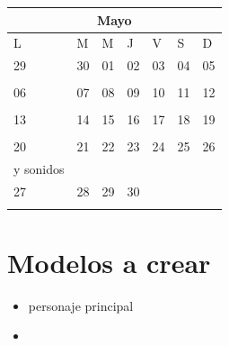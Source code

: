 \documentclass{article}
\begin{document}
\begin{center} 
\begin{tabular}{|m{2cm}|m{2cm}|m{2cm}|m{2cm}|m{2cm}|m{2cm}|m{2cm}|} 
\multicolumn{7}{c}{Mayo}\\
\hline
L&M&M&J&V&S&D\\
\hline
29&30&01&02&03&04&05\\
&&&&&&\\
\hline
06&07&08&09&10&11&12\\
&&&&&&\\
\hline
13&14&15&16&17&18&19\\
&&&&&&\\
\hline
20&21&22&23&24&25&26\\
y sonidos
&&&&&&\\
\hline
27&28&29&30&&&\\


&&&&&&\\
\hline
\end{tabular} 
\end{center}

\section{Modelos a crear}
\begin{itemize}
    \item personaje principal
    \item 
\end{itemize}
\end{document}
